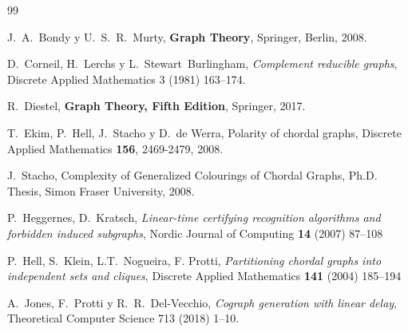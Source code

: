 \begin{thebibliography}{99}

  J.~A.~Bondy y U.~S.~R.~Murty,
  \textbf{Graph Theory},
  Springer, Berlin, 2008.

  D.~Corneil, H.~Lerchs y L.~Stewart~Burlingham,
  \textit{Complement reducible graphs},
  Discrete Applied Mathematics 3 (1981) 163--174.

  R.~Diestel,
  \textbf{Graph Theory, Fifth Edition},
  Springer, 2017.

  T.~Ekim, P.~Hell, J.~Stacho y D.~de Werra,
  Polarity of chordal graphs,
  Discrete Applied Mathematics \textbf{156},
  2469-2479,
  2008.

  J.~Stacho,
  Complexity of Generalized Colourings of Chordal Graphs,
  Ph.D. Thesis,
  Simon Fraser University,
  2008.

    P.~Heggernes, D.~Kratsch,
    \textit{Linear-time certifying recognition algorithms and forbidden induced
    subgraphs},
    Nordic Journal of Computing \textbf{14} (2007) 87--108

	P.~Hell, S.~Klein, L.T.~Nogueira, F. Protti,
  \textit{Partitioning chordal graphs into independent sets and cliques},
	Discrete Applied Mathematics \textbf{141} (2004) 185--194

  A.~Jones, F.~Protti y R.~R.~Del-Vecchio,
  \textit{Cograph generation with linear delay},
  Theoretical Computer Science 713 (2018) 1--10.

\end{thebibliography}
